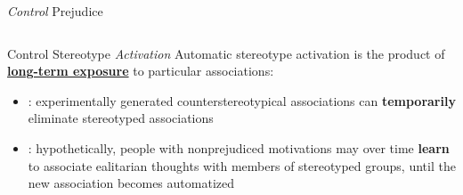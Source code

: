 \begin{frame}{\textit{Control} Prejudice}
    \begin{columns}[T]
        \begin{column}{0.8\textwidth}
            \vspace*{-2pt}

        \end{column}
    \end{columns}
    
\end{frame}

\begin{frame}{Control Stereotype \textit{Activation}}
    Automatic stereotype activation is the product of \textcolor{lightlavender!55!white}{\underline{\textbf{long-term exposure}}} to particular associations:
    \begin{itemize}
        \item<+-> \underline{\textit{\citet{kawakami2000just}}}: experimentally generated counterstereotypical associations can \textcolor{lightlavender!55!white}{\textbf{temporarily}} eliminate stereotyped associations
        \item<+-> \underline{\textit{\citet{bargh1999cognitive,moskowitz1999preconscious}}}: hypothetically, people with nonprejudiced motivations may over time \textcolor{lightlavender!55!white}{\textbf{learn}} to associate ealitarian thoughts with members of stereotyped groups, until the new association becomes automatized
    \end{itemize}
\end{frame}

